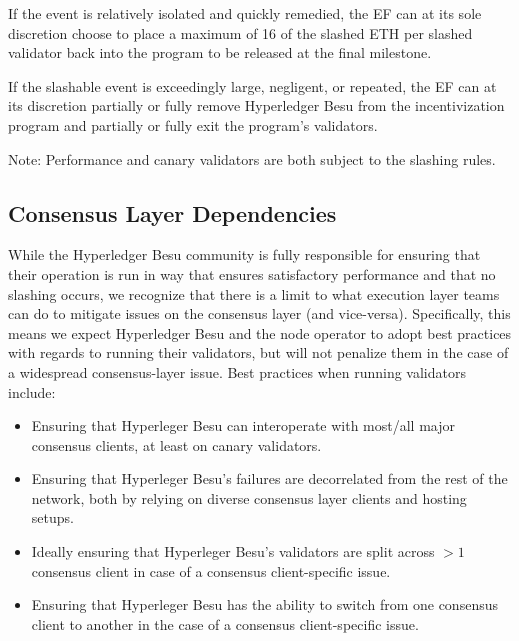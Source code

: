 If the event is relatively isolated and quickly remedied, the EF can at its sole discretion choose to place a maximum of 16 of the slashed ETH per slashed validator back into the program to be released at the final milestone.

If the slashable event is exceedingly large, negligent, or repeated, the EF can at its discretion partially or fully remove Hyperledger Besu from the incentivization program and partially or fully exit the program’s validators.

Note: Performance and canary validators are both subject to the slashing rules.

\subsection{Consensus Layer Dependencies}
While the Hyperledger Besu community is fully responsible for ensuring that their operation is run in way that ensures satisfactory performance and that no slashing occurs, we recognize that there is a limit to what execution layer teams can do to mitigate issues on the consensus layer (and vice-versa). Specifically, this means we expect Hyperledger Besu and the node operator to adopt best practices with regards to running their validators, but will not penalize them in the case of a widespread consensus-layer issue. Best practices when running validators include:
\begin{itemize}
\item Ensuring that Hyperleger Besu can interoperate with most/all major consensus clients, at least on canary validators.
\item Ensuring that Hyperleger Besu’s failures are decorrelated from the rest of the network, both by relying on diverse consensus layer clients and hosting setups.
\item Ideally ensuring that Hyperleger Besu’s validators are split across $>1$ consensus client in case of a consensus client-specific issue.
\item Ensuring that Hyperleger Besu has the ability to switch from one consensus client to another in the case of a consensus client-specific issue.
\end{itemize}